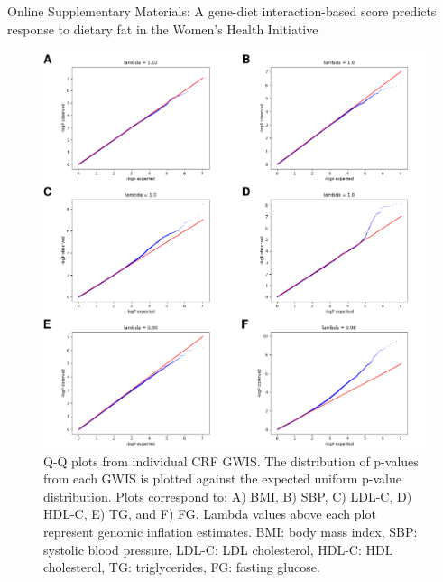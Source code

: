 \documentclass[]{article}
\begin{document}
\newpage
Online Supplementary Materials: A gene-diet interaction-based score
predicts response to dietary fat in the Women's Health Initiative

\begin{figure}[H]
\centering
\includegraphics{figures/show-qq-plots-1.pdf}
\caption{Q-Q plots from individual CRF GWIS. The distribution of
p-values from each GWIS is plotted against the expected uniform p-value
distribution. Plots correspond to: A) BMI, B) SBP, C) LDL-C, D) HDL-C,
E) TG, and F) FG. Lambda values above each plot represent genomic
inflation estimates. BMI: body mass index, SBP: systolic blood pressure,
LDL-C: LDL cholesterol, HDL-C: HDL cholesterol, TG: triglycerides, FG:
fasting glucose.}
\end{figure}
\end{document}

